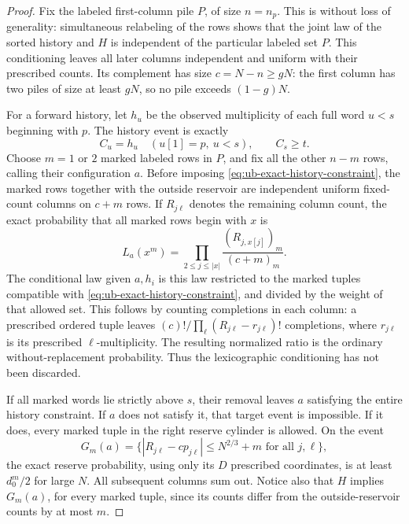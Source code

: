 \documentclass[11pt]{article}
\numberwithin{equation}{section}
\newcommand{\1}{\mathbf 1}
\begin{document}
\begin{proof}
Fix the labeled first-column pile \(P\), of size \(n=n_p\).
This is without loss of generality: simultaneous relabeling of the
rows shows that the joint law of the sorted history and \(H\) is
independent of the particular labeled set \(P\).
This conditioning leaves all later columns independent and uniform
with their prescribed counts. Its complement has size
\(c=N-n\ge gN\): the first column has two piles of size at least
\(gN\), so no pile exceeds \((1-g)N\).

For a forward history, let \(h_u\) be the observed multiplicity of
each full word \(u<s\) beginning with \(p\). The history event is exactly
\begin{equation}
\label{eq:ub-exact-history-constraint}
 C_u=h_u\quad(u[1]=p,\ u<s),\qquad C_s\ge t.
\end{equation}
Choose \(m=1\) or \(2\) marked labeled rows in \(P\), and fix
all the other \(n-m\) rows, calling their configuration \(a\).
Before imposing \eqref{eq:ub-exact-history-constraint}, the marked
rows together with the outside reservoir are independent uniform
fixed-count columns on \(c+m\) rows. If \(R_{j\ell}\) denotes
the remaining column count, the exact probability that all marked
rows begin with \(x\) is
\begin{equation}
\label{eq:ub-reservoir-exact-prefix-weight}
 L_a(x^m)=\prod_{2\le j\le |x|}
                  \frac{(R_{j,x[j]})_m}{(c+m)_m}.
\end{equation}
The conditional law given \(a,h_i\) is this law restricted to the
marked tuples compatible with \eqref{eq:ub-exact-history-constraint},
and divided by the weight of that allowed set. This follows by
counting completions in each column: a prescribed ordered tuple
leaves \((c)!/\prod_\ell(R_{j\ell}-r_{j\ell})!\) completions,
where \(r_{j\ell}\) is its prescribed \(\ell\)-multiplicity.
The resulting normalized ratio is the ordinary without-replacement
probability. Thus the lexicographic conditioning has not been
discarded.

If all marked words lie strictly above \(s\), their removal leaves
\(a\) satisfying the entire history constraint. If \(a\) does
not satisfy it, that target event is impossible. If it does, every
marked tuple in the right reserve cylinder is allowed. On the event
\[
 G_m(a)=\{|R_{j\ell}-cp_{j\ell}|\le N^{2/3}+m
                           \text{ for all }j,\ell\},
\]
the exact reserve probability, using only its \(D\) prescribed
coordinates, is at least \(d_0^m/2\) for large \(N\).
All subsequent columns sum out. Notice also that \(H\) implies
\(G_m(a)\), for every marked tuple, since its counts differ from
the outside-reservoir counts by at most \(m\).


\end{proof}
\end{document}
